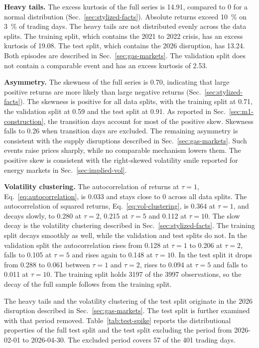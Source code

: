 \textbf{Heavy tails.} The excess kurtosis of the full series is \num{14.91}, compared to 0 for a normal distribution (Sec.~\ref{sec:stylized-facts}). Absolute returns exceed \SI{10}{\percent} on \SI{3}{\percent} of trading days. The heavy tails are not distributed evenly across the data splits. The training split, which contains the 2021 to 2022 crisis, has an excess kurtosis of \num{19.08}. The test split, which contains the 2026 disruption, has \num{13.24}. Both episodes are described in Sec.~\ref{sec:gas-markets}. The validation split does not contain a comparable event and has an excess kurtosis of \num{2.53}.

\textbf{Asymmetry.} The skewness of the full series is \num{0.70}, indicating that large positive returns are more likely than large negative returns (Sec.~\ref{sec:stylized-facts}). The skewness is positive for all data splits, with the training split at \num{0.71}, the validation split at \num{0.59} and the test split at \num{0.91}. As reported in Sec.~\ref{sec:m1-construction}, the transition days account for most of the positive skew. Skewness falls to \num{0.26}
when transition days are excluded. The remaining asymmetry is consistent with the supply disruptions described in
Sec.~\ref{sec:gas-markets}. Such events raise prices sharply, while no comparable mechanism lowers them. The positive skew is consistent with the right-skewed volatility smile reported for energy markets in Sec.~\ref{sec:implied-vol}.

\textbf{Volatility clustering.} The autocorrelation of returns at $\tau=1$, Eq.~\eqref{eq:autocorrelation}, is \num{0.033} and stays close to 0 across all data splits. The autocorrelation of squared returns, Eq.~\eqref{eq:vol-clustering}, is \num{0.364} at $\tau=1$, and decays slowly, to \num{0.280} at $\tau=2$, \num{0.215} at $\tau=5$ and \num{0.112} at $\tau=10$. The slow decay is the volatility clustering described in Sec.~\ref{sec:stylized-facts}.
The training split decays smoothly as well, while the validation and
test splits do not.
In the validation split the autocorrelation rises from \num{0.128} at $\tau=1$ to \num{0.206} at $\tau=2$, falls to \num{0.105} at $\tau=5$ and rises again to \num{0.148} at $\tau=10$. In the test split it drops from \num{0.288} to \num{0.061} between $\tau=1$ and $\tau=2$, rises to \num{0.094} at $\tau=5$ and falls to \num{0.011} at $\tau=10$. The training split holds \num{3197} of the \num{3997} observations, so the decay of the full sample follows from the training split.

The heavy tails and the volatility clustering of the test split originate in the 2026 disruption described in Sec.~\ref{sec:gas-markets}. The test split is further examined with that period removed. Table~\ref{tab:test-spike} reports the distributional properties of the full test split and the test split excluding the period from 2026-02-01 to 2026-04-30. The excluded period covers \num{57} of the \num{401} trading days.


